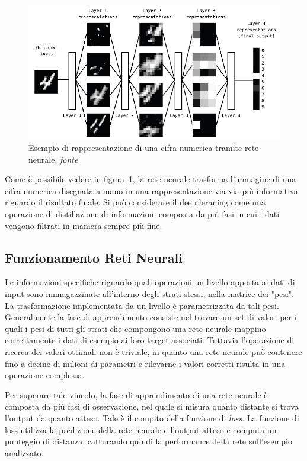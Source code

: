 \begin{figure}[!bp]
	\centering
	\includegraphics[width=\columnwidth]{figures/deeplearning.png}
	\caption{Esempio di rappresentazione di una cifra numerica tramite rete neurale. \textit{fonte}%
	~\cite{chollet2017deep} \label{fig:neuralnetwork} }
\end{figure}

Come è possibile vedere in figura~\ref{fig:neuralnetwork}, la rete neurale trasforma l'immagine di una cifra numerica disegnata a mano in una rappresentazione via via più informativa riguardo il risultato finale. Si può considerare il deep leraning come una operazione di distillazione di informazioni composta da più fasi in cui i dati vengono filtrati in maniera sempre più fine.

\subsection{Funzionamento Reti Neurali}
Le informazioni specifiche riguardo quali operazioni un livello apporta ai dati di input sono immagazzinate all'interno degli strati stessi, nella matrice dei "pesi". La trasformazione implementata da un livello è parametrizzata da tali pesi. Generalmente la fase di apprendimento consiste nel trovare un set di valori per i quali i pesi di tutti gli strati che compongono una rete neurale mappino correttamente i dati di esempio ai loro target associati.
Tuttavia l'operazione di ricerca dei valori ottimali non è triviale, in quanto una rete neurale può contenere fino a decine di milioni di parametri e rilevarne i valori corretti risulta in una operazione complessa.

Per superare tale vincolo, la fase di apprendimento di una rete neurale è composta da più fasi di osservazione, nel quale si misura quanto distante si trova l'output da quanto atteso. Tale è il compito della funzione di \textit{loss}. La funzione di loss utilizza la predizione della rete neurale e l'output atteso e computa un punteggio di distanza, catturando quindi la performance della rete sull'esempio analizzato.

